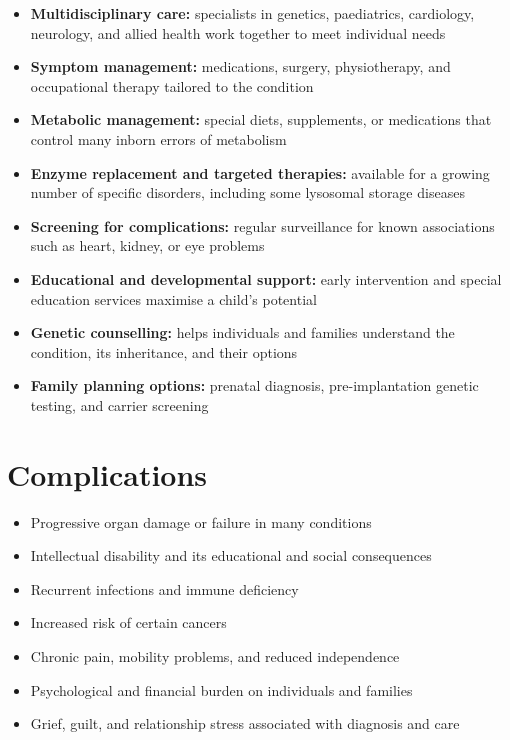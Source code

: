 \begin{itemize}
    \item \textbf{Multidisciplinary care:} specialists in genetics, paediatrics, cardiology, neurology, and allied health work together to meet individual needs
    \item \textbf{Symptom management:} medications, surgery, physiotherapy, and occupational therapy tailored to the condition
    \item \textbf{Metabolic management:} special diets, supplements, or medications that control many inborn errors of metabolism
    \item \textbf{Enzyme replacement and targeted therapies:} available for a growing number of specific disorders, including some lysosomal storage diseases
    \item \textbf{Screening for complications:} regular surveillance for known associations such as heart, kidney, or eye problems
    \item \textbf{Educational and developmental support:} early intervention and special education services maximise a child's potential
    \item \textbf{Genetic counselling:} helps individuals and families understand the condition, its inheritance, and their options
    \item \textbf{Family planning options:} prenatal diagnosis, pre-implantation genetic testing, and carrier screening
\end{itemize}

\section*{Complications}
\begin{itemize}
    \item Progressive organ damage or failure in many conditions
    \item Intellectual disability and its educational and social consequences
    \item Recurrent infections and immune deficiency
    \item Increased risk of certain cancers
    \item Chronic pain, mobility problems, and reduced independence
    \item Psychological and financial burden on individuals and families
    \item Grief, guilt, and relationship stress associated with diagnosis and care
\end{itemize}

